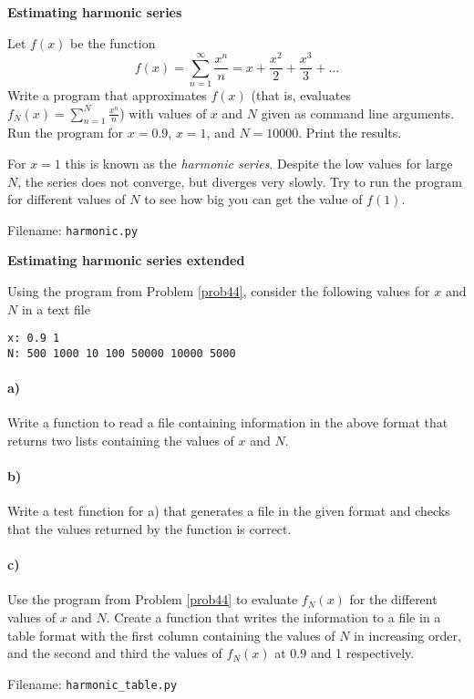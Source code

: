 \begin{Problem}{\textbf{Estimating harmonic series}} \label{prob44}

\noindent Let $f(x)$ be the function
\begin{equation*}
    f(x)=\sum_{n=1}^\infty\frac{x^n}{n}=x+\frac{x^2}{2}+\frac{x^3}{3}+\dots
\end{equation*}
Write a program that approximates $f(x)$ (that is, evaluates $f_N(x)=\sum_{n=1}^N
\frac{x^n}{n}$) with values of $x$ and $N$ given
as command line arguments. Run the program for $x=0.9$, $x=1$, and $N=10000$.
Print the results.

\begin{remark}
For $x=1$ this is known as the \emph{harmonic series}. Despite the low values for
large $N$, the series does not converge, but diverges very slowly. Try to run the
program for different values of $N$ to see how big you can get the value of $f(1)$.
\end{remark}

Filename: \texttt{harmonic.py}
\end{Problem}



\begin{Problem}{\textbf{Estimating harmonic series extended}} \label{prob45}

\noindent Using the program from Problem \ref{prob44}, consider the following values for $x$ and $N$
in a text file
\begin{lstlisting}
x: 0.9 1
N: 500 1000 10 100 50000 10000 5000
\end{lstlisting}

\paragraph{a)}
Write a function to read a file containing information in the above format that
returns two lists containing the values of $x$ and $N$.
\paragraph{b)}
Write a test function for a) that generates a file in the given format and checks
that the values returned by the function is correct.
\paragraph{c)}
Use the program from Problem \ref{prob44} to evaluate $f_N(x)$ for the different values of
$x$ and $N$. Create a function that writes the information to a file in a table format with the first
column containing the values of $N$ in increasing order, and the second and third the values of $f_N(x)$
at 0.9 and 1 respectively.

Filename: \texttt{harmonic\_table.py}
\end{Problem}


